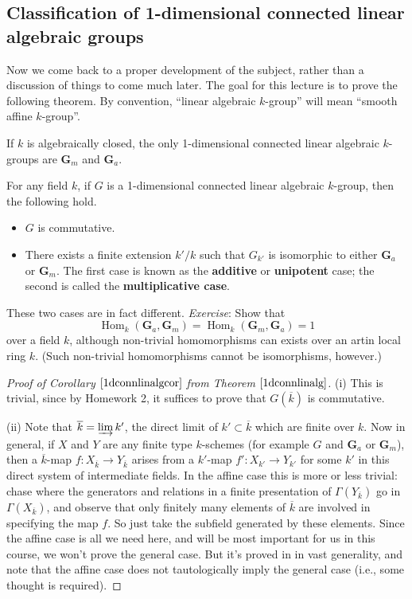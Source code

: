 \documentclass[10pt]{article}
\newcommand{\Hom}{\operatorname{Hom}}
\renewcommand{\(}{\left(}
\renewcommand{\)}{\right)}
\renewcommand{\bar}{\overline}
\numberwithin{thm}{subsection}
\begin{document}
\subsection{Classification of 1-dimensional connected linear algebraic groups}
Now we come back to a proper development
of the subject, rather than a discussion of things to come much
later. The goal for this lecture is to prove the following theorem.
By convention, ``linear algebraic $k$-group'' will mean
``smooth affine $k$-group''.
\begin{thm}\label{1dconnlinalg}If $k$ is algebraically closed, the only
1-dimensional connected linear algebraic $k$-groups are $\mathbf{G}_m$ and $\mathbf{G}_a$.
\end{thm}
\begin{cor}\label{1dconnlinalgcor}
For any field $k$, if $G$ is a 1-dimensional connected linear algebraic $k$-group,
then the following hold.
\begin{itemize}
\item[(i)] $G$ is commutative.
\item[(ii)] There exists a finite extension $k'/k$
such that $G_{k'}$ is isomorphic to either $\mathbf{G}_a$ or $\mathbf{G}_m$.
The first case is known as the \textbf{additive} or \textbf{unipotent}
case; the second is called the \textbf{multiplicative case}.
\end{itemize}
\end{cor}
\begin{rem}These two cases are in fact different. \textit{Exercise}: Show that
$$\Hom_k(\mathbf{G}_a,\mathbf{G}_m)=\Hom_k(\mathbf{G}_m,\mathbf{G}_a)=1$$ over a field $k$,
although non-trivial homomorphisms can exists over an artin local ring $k$.
(Such non-trivial homomorphisms cannot be isomorphisms, however.)
\end{rem}
\begin{proof}[Proof of Corollary $\ref{1dconnlinalgcor}$ from Theorem
$\ref{1dconnlinalg}$]
(i) This is trivial, since by Homework 2, it suffices to prove that $G(\bar k)$ is commutative.

(ii) Note that $\bar k =\varinjlim k'$, the direct limit
of $k'\subset\bar k$ which are finite over $k$.
Now in general, if $X$ and $Y$ are any finite type $k$-schemes
(for example $G$ and $\mathbf{G}_a$ or $\mathbf{G}_m$),
then a $\bar k$-map $f:X_{\bar k}\to Y_{\bar k}$ arises from
a $k'$-map $f':X_{k'}\to Y_{k'}$ for some $k'$ in this direct system of
intermediate fields. In the affine case this is more or less trivial:
chase where the generators and relations in a finite presentation
of $\Gamma(Y_{\bar k})$ go in $\Gamma(X_{\bar k})$,
and observe that only finitely many elements of $\bar k$ are involved
in specifying the map $f$. So just take the subfield generated by these elements. Since the affine case is all we need here, and will be most important for us in this course, we won't prove the general case.
But it's proved in \cite[IV$_3$, \S8]{ega} in vast generality, and note that the affine case does not tautologically
imply the general case (i.e., some thought is required). 
\end{proof}
\end{document}
